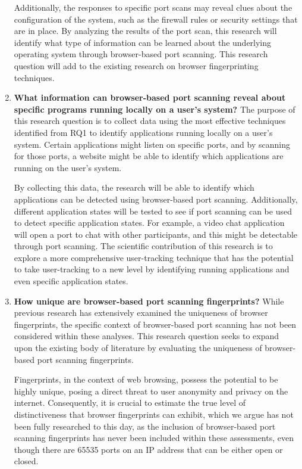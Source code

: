 \begin{enumerate}[RQ1.]
Additionally, the responses to specific port scans may reveal clues about the configuration of the system, such as the firewall rules or security settings that are in place. By analyzing the results of the port scan, this research will identify what type of information can be learned about the underlying operating system through browser-based port scanning. This research question will add to the existing research on browser fingerprinting techniques.

\item \textbf{What information can browser-based port scanning reveal about specific programs running locally on a user's system?} The purpose of this research question is to collect data using the most effective techniques identified from RQ1 to identify applications running locally on a user's system. Certain applications might listen on specific ports, and by scanning for those ports, a website might be able to identify which applications are running on the user's system.

By collecting this data, the research will be able to identify which applications can be detected using browser-based port scanning. Additionally, different application states will be tested to see if port scanning can be used to detect specific application states. For example, a video chat application will open a port to chat with other participants, and this might be detectable through port scanning. The scientific contribution of this research is to explore a more comprehensive user-tracking technique that has the potential to take user-tracking to a new level by identifying running applications and even specific application states.

\item \textbf{How unique are browser-based port scanning fingerprints?}
While previous research has extensively examined the uniqueness of browser fingerprints, the specific context of browser-based port scanning has not been considered within these analyses. This research question seeks to expand upon the existing body of literature by evaluating the uniqueness of browser-based port scanning fingerprints.

Fingerprints, in the context of web browsing, possess the potential to be highly unique, posing a direct threat to user anonymity and privacy on the internet. Consequently, it is crucial to estimate the true level of distinctiveness that browser fingerprints can exhibit, which we argue has not been fully researched to this day, as the inclusion of browser-based port scanning fingerprints has never been included within these assessments, even though there are 65535 ports on an IP address that can be either open or closed.
\end{enumerate}

